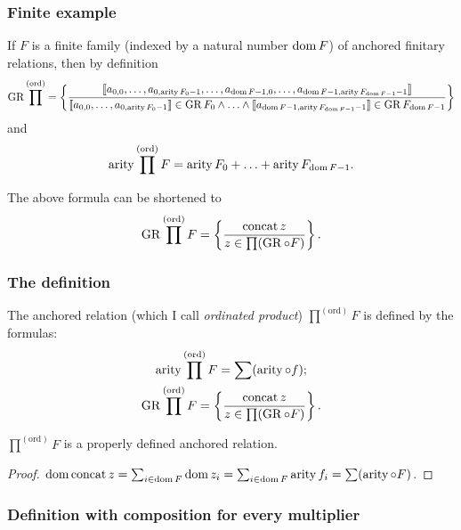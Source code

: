 \subsubsection{Finite example}

If $F$ is a finite family (indexed by a natural number $\operatorname{dom} F$)
of anchored finitary relations, then by definition \[
\operatorname{GR}\prod^\mathrm{(ord)} =
\left\{ \frac{
\llbracket a_{0, 0} , \ldots , a_{0, \operatorname{arity} F_0 - 1} , \ldots , a_{\operatorname{dom} F - 1, 0} , \ldots , a_{\operatorname{dom} F - 1, \operatorname{arity} F_{\operatorname{dom} F - 1} - 1} \rrbracket
}{
\llbracket a_{0, 0} , \ldots , a_{0, \operatorname{arity} F_0 - 1} \rrbracket \in \operatorname{GR} F_0 \land \ldots \land \llbracket a_{\operatorname{dom} F - 1, \operatorname{arity} F_{\operatorname{dom} F - 1} - 1} \rrbracket \in \operatorname{GR} F_{\operatorname{dom} F - 1}
}\right\}
\]and 
\[
\operatorname{arity}\prod^{\mathrm{(ord)}}F=\operatorname{arity} F_{0}+\ldots+\operatorname{arity} F_{\operatorname{dom} F-1}.
\]


The above formula can be shortened to
\[
\operatorname{GR}\prod^{\mathrm{(ord)}}F=\left\{ \frac{\operatorname{concat} z}{z\in\prod(\operatorname{GR}\circ F)}\right\}.
\]



\subsubsection{The definition}
\begin{defn}
The anchored relation (which I call \emph{ordinated
product}) $\prod^{\mathrm{(ord)}}F$ is defined by the formulas:
\begin{gather*}
\operatorname{arity}\prod^{\mathrm{(ord)}}F=\sum(\operatorname{arity}\circ f);\\
\operatorname{GR}\prod^{\mathrm{(ord)}}F=\left\{ \frac{\operatorname{concat} z}{z\in\prod(\operatorname{GR}\circ F)}\right\}.
\end{gather*}
\end{defn}
\begin{prop}
$\prod^{\mathrm{(ord)}}F$ is a properly defined anchored relation.\end{prop}
\begin{proof}
$\operatorname{dom}\operatorname{concat} z=\sum_{i\in\operatorname{dom} F}\operatorname{dom} z_{i}=\sum_{i\in\operatorname{dom} F}\operatorname{arity} f_{i}=\sum(\operatorname{arity}\circ F)$.
\end{proof}

\subsubsection{Definition with composition for every multiplier}

